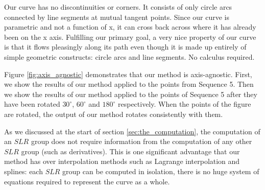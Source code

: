 \documentclass{article}
\begin{document}
Our curve has no discontinuities or corners. It consists of only circle arcs connected by line segments at mutual tangent points. Since our curve is parametric and not a function of x, it can cross back across where it has already been on the x axis. Fulfilling our primary goal, a very nice property of our curve is that it flows pleasingly along its path even though it is made up entirely of simple geometric constructs: circle arcs and line segments. No calculus required.

Figure \ref{fig:axis_agnostic} demonstrates that our method is axis-agnostic. First, we show the results of our method applied to the points from Sequence 5. Then we show the results of our method applied to the points of Sequence 5 after they have been rotated $30^\circ$, $60^\circ$ and $180^\circ$ respectively. When the points of the figure are rotated, the output of our method rotates consistently with them.

As we discussed at the start of section \ref{sec:the_computation}, the computation of an $SLR$ group does not require information from the computation of any other $SLR$ group (such as derivatives). This is one significant advantage that our method has over interpolation methods such as Lagrange interpolation and splines: each $SLR$ group can be computed in isolation, there is no huge system of equations required to represent the curve as a whole.
\end{document}
